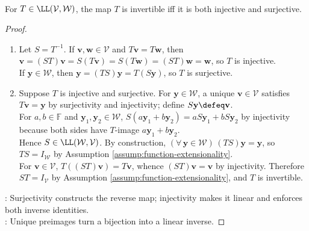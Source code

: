 \begin{proposition} \label{prop:linear-map-invertible-iff-bijective} \\
For $T\in\LL(\mathcal{V},\mathcal{W})$, the map $T$ is invertible iff it is both injective and surjective.
\begin{proof}
\begin{enumerate}[label=\roman*.]
\setlength{\itemsep}{0pt}
\item[$(\Rightarrow)$] Let $S=T^{-1}$. If $\mathbf{v},\mathbf{w}\in\mathcal{V}$ and $T\mathbf{v}=T\mathbf{w}$, then $\mathbf{v}=(ST)\mathbf{v}=S(T\mathbf{v})=S(T\mathbf{w})=(ST)\mathbf{w}=\mathbf{w}$, so $T$ is injective.\\
If $\mathbf{y}\in\mathcal{W}$, then $\mathbf{y}=(TS)\mathbf{y}=T(S\mathbf{y})$, so $T$ is surjective.
\item[$(\Leftarrow)$] Suppose $T$ is injective and surjective. For $\mathbf{y}\in\mathcal{W}$, a unique $\mathbf{v}\in\mathcal{V}$ satisfies $T\mathbf{v}=\mathbf{y}$ by surjectivity and injectivity; define $S\mathbf{y}\defeq\mathbf{v}$.\\
For $a,b\in\mathbb{F}$ and $\mathbf{y}_1,\mathbf{y}_2\in\mathcal{W}$, $S(a\mathbf{y}_1+b\mathbf{y}_2)=aS\mathbf{y}_1+bS\mathbf{y}_2$ by injectivity because both sides have $T$-image $a\mathbf{y}_1+b\mathbf{y}_2$.\\
Hence $S\in\LL(\mathcal{W},\mathcal{V})$. By construction, $(\forall\,\mathbf{y}\in\mathcal{W})\,(TS)\mathbf{y}=\mathbf{y}$, so $TS=I_{\mathcal{W}}$ by Assumption \ref{assump:function-extensionality}.\\
For $\mathbf{v}\in\mathcal{V}$, $T((ST)\mathbf{v})=T\mathbf{v}$, whence $(ST)\mathbf{v}=\mathbf{v}$ by injectivity. Therefore $ST=I_{\mathcal{V}}$ by Assumption \ref{assump:function-extensionality}, and $T$ is invertible.
\end{enumerate}
: Surjectivity constructs the reverse map; injectivity makes it linear and enforces both inverse identities.\\
: Unique preimages turn a bijection into a linear inverse.
\end{proof}
\end{proposition}

